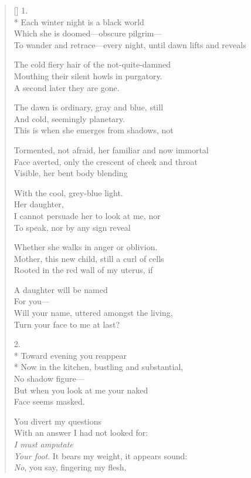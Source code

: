 \label{ch:threedreams}
\settowidth{\versewidth}{To wander and retrace---every night, until dawn lifts and reveals}
\begin{verse}[\versewidth]
1.\\*
Each winter night is a black world\\
Which she is doomed---obscure pilgrim---\\
To wander and retrace---every night, until dawn lifts and reveals

The cold fiery hair of the not-quite-damned\\
Mouthing their silent howls in purgatory.\\
\qquad A second later they are gone.

The dawn is ordinary, gray and blue, still\\
And cold, seemingly planetary.\\
This is when she emerges from shadows, not 

Tormented, not afraid, her familiar and now immortal\\
Face averted, only the crescent of cheek and throat\\
Visible, her bent body blending

With the cool, grey-blue light.\\
\hspace*{5\vgap} Her daughter,\\
I cannot persuade her to look at me, nor\\
To speak, nor by any sign reveal

Whether she walks in anger or oblivion.\\
Mother, this new child, still a curl of cells\\
Rooted in the red wall of my uterus, if

A daughter will be named\\
For you---\\
\hfill Will your name, uttered amongst the living,\\
Turn your face to me at last?

2.\\*
Toward evening you reappear\\*
Now in the kitchen, bustling and substantial,\\
No shadow figure---\\
But when you look at me your naked \\
Face seems masked.

You divert my questions\\
With an answer I had not looked for:\\
\textit{I must amputate \\
Your foot}. It bears my weight, it appears sound:\\
\textit{No}, you say, fingering my flesh,


\end{verse}
